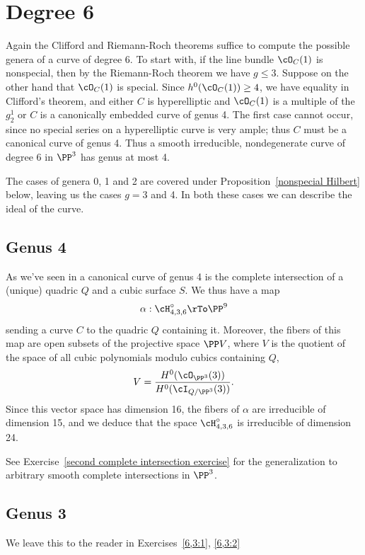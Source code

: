 \section{Degree 6}

Again the Clifford and Riemann-Roch theorems suffice to compute the possible genera of a curve of degree 6. To start with,  if the line bundle $\cO_C(1)$ is nonspecial, then by the Riemann-Roch theorem we have $g \leq 3$. Suppose on the other hand that $\cO_C(1)$ is special. Since   $h^{0}(\cO_C(1)) \geq 4$, we have equality in Clifford's theorem, and either $C$ is hyperelliptic and $\cO_C(1)$ is a multiple of the $g^{1}_{2}$ or  $C$ is  a canonically embedded curve of genus 4. The first case cannot occur, since no special series on a hyperelliptic curve is very ample; thus $C$ must be a canonical curve of genus 4. Thus a smooth irreducible, nondegenerate curve of degree 6 in $\PP^3$ has genus at most 4.


The cases of genera 0, 1 and 2 are covered under Proposition~\ref{nonspecial Hilbert} below, leaving us the cases $g = 3$ and 4. In both these cases we can describe the ideal of the curve.

\subsection{Genus 4}

As we've seen in 
a canonical curve of genus 4 is the complete intersection of a (unique) quadric $Q$ and a cubic surface $S$. We thus have a map
$$
\alpha : \cH^\circ_{4,3,6} \rTo \PP^9
$$
sending a curve $C$ to the quadric $Q$ containing it. Moreover, the fibers of this map are open subsets of the projective space $\PP V$, where $V$ is the quotient of the space of all cubic polynomials modulo cubics containing $Q$, 
$$
V = \frac{H^0(\cO_{\PP^3}(3))}{H^0(\cI_{Q/\PP^3}(3))}.
$$
Since this vector space has dimension 16, the fibers of $\alpha$ are irreducible of dimension 15, and we deduce that the space $\cH^\circ_{4,3,6}$ is irreducible of dimension 24.

See Exercise~\ref{second complete intersection exercise} for the generalization to arbitrary smooth complete intersections in $\PP^3$.

\subsection{Genus 3}
We leave this to the reader in Exercises~\ref{6,3:1}, \ref{6,3:2}


